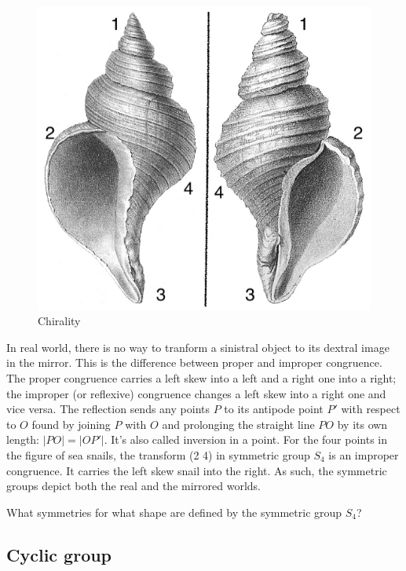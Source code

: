 \documentclass[b5paper]{article}
\begin{document}
\begin{figure}[htbp]
 \centering
 \includegraphics[scale=0.3]{img/chirality.jpg}
 \caption{Chirality}
 \label{fig:chirality}
\end{figure}

In real world, there is no way to tranform a sinistral object to its dextral image in the mirror. This is the difference between proper and improper congruence. The proper congruence carries a left skew into a left and a right one into a right; the improper (or reflexive) congruence changes a left skew into a right one and vice versa\cite{Weyl1952}. The reflection sends any points $P$ to its antipode point $P'$ with respect to $O$ found by joining $P$ with $O$ and prolonging the straight line $PO$ by its own length: $|PO| = |OP'|$. It's also called inversion in a point. For the four points in the figure of sea snails, the transform (2 4) in symmetric group $S_4$ is an improper congruence. It carries the left skew snail into the right. As such, the symmetric groups depict both the real and the mirrored worlds.

\begin{Exercise}
What symmetries for what shape are defined by the symmetric group $S_4$?
\end{Exercise}

\subsection{Cyclic group}
\end{document}
